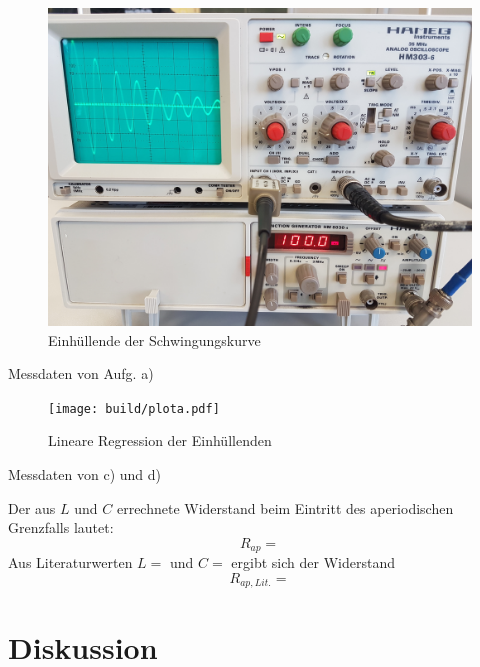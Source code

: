   \begin{figure}[H]
    \includegraphics[width=\textwidth]{images/5a.jpg}
    \centering
    \caption{Einhüllende der Schwingungskurve}
    \label{fig:4ajpg}
  \end{figure}

  \begin{table}[H]
        \centering
        \caption{Messdaten von Aufg. a)}
         
        \label{tab:data_a}
  \end{table}

  \begin{figure}[H]
    \texttt{[image: build/plota.pdf]}
    \centering
    \caption{Lineare Regression der Einhüllenden}
    \label{fig:4ajpg}
  \end{figure}


  \begin{table}[H]
        \centering
        \caption{Messdaten von c) und d)}
         
        \label{tab:data_c}
  \end{table}

  Der aus $L$ und $C$ errechnete Widerstand beim Eintritt des aperiodischen Grenzfalls lautet:
  \begin{equation}
  R_{ap} = \text{}
  \end{equation}
  Aus Literaturwerten $L = \text{}$ und $C =\text{}$ ergibt sich der Widerstand 
  \begin{equation}
  R_{ap, Lit.} = \text{}
  \end{equation}

\section{Diskussion}\justifying

\newpage
\nocite{V354}
\nocite{V353}
\printbibliography






